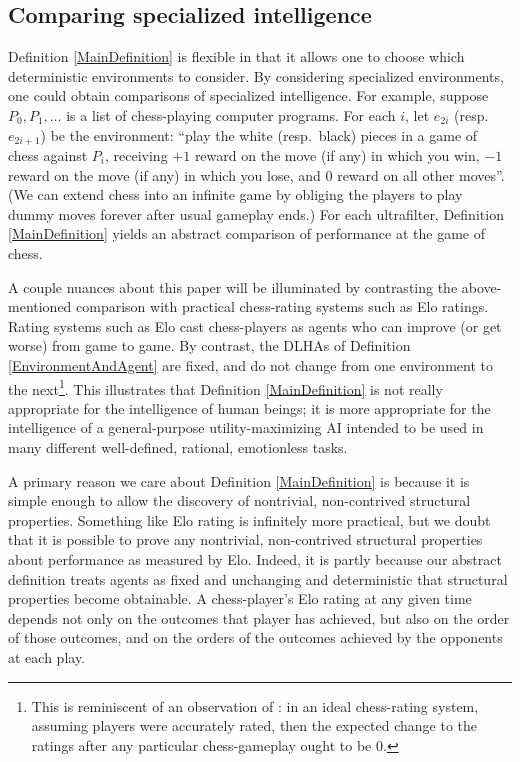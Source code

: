 \documentclass[twoside,11pt]{article}
\begin{document}
    \subsection{Comparing specialized intelligence}

    Definition \ref{MainDefinition} is flexible in that it
    allows one to choose which deterministic environments to consider.
    By considering specialized environments, one could obtain
    comparisons of specialized intelligence. For example,
    suppose $P_0,P_1,\ldots$ is a list of
    chess-playing computer programs. For each $i$, let $e_{2i}$
    (resp.\ $e_{2i+1}$)
    be the environment: ``play the white (resp.\ black) pieces
    in a game of chess against $P_i$, receiving $+1$ reward
    on the move (if any) in which you win, $-1$ reward
    on the move (if any) in which you lose, and $0$
    reward on all other moves''. (We can extend chess into an
    infinite game by obliging the players to play
    dummy moves forever after usual gameplay ends.)
    For each ultrafilter, Definition \ref{MainDefinition} yields
    an abstract comparison of performance at the game of
    chess.

    A couple nuances about this paper will be illuminated by contrasting
    the above-mentioned comparison with practical chess-rating systems
    such as Elo ratings. Rating systems such as Elo
    cast chess-players as agents who can improve (or get worse)
    from game to game. By contrast, the DLHAs of
    Definition \ref{EnvironmentAndAgent} are fixed, and do not
    change from one environment to the next\footnote{This is reminiscent of
    an observation of \citet{good}: in an ideal chess-rating system,
    assuming players were accurately rated, then the expected change to the ratings
    after any particular chess-gameplay ought to be $0$.}. This illustrates that
    Definition \ref{MainDefinition} is not really appropriate for
    the intelligence of human beings; it is more appropriate
    for the intelligence of a general-purpose utility-maximizing AI intended
    to be used in many different well-defined, rational, emotionless tasks.

    A primary reason we care about Definition \ref{MainDefinition} is
    because it is simple enough to allow the discovery
    of nontrivial, non-contrived structural properties.
    Something like Elo rating is infinitely more practical, but
    we doubt that it is possible to prove any nontrivial,
    non-contrived structural properties about performance as
    measured by Elo. Indeed, it is partly because
    our abstract definition treats agents as fixed and unchanging and deterministic
    that structural properties become obtainable. A chess-player's
    Elo rating at any given time depends not only on the outcomes
    that player has achieved, but also on the order of those outcomes,
    and on the orders of the outcomes achieved by the opponents
    at each play.
\end{document}
